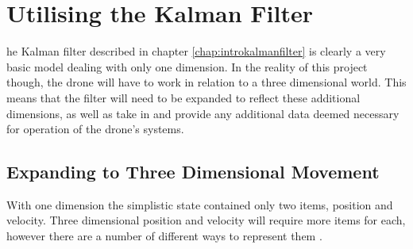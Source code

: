 \let\textcircled=\pgftextcircled
\chapter{Utilising the Kalman Filter}
\label{chap:utilisingkalman}

he Kalman filter described in chapter \ref{chap:introkalmanfilter} is clearly a very basic model dealing with only one dimension. In the reality of this project though, the drone will have to work in relation to a three dimensional world. This means that the filter will need to be expanded to reflect these additional dimensions, as well as take in and provide any additional data deemed necessary for operation of the drone's systems. \par

\section{Expanding to Three Dimensional Movement}
With one dimension the simplistic state contained only two items, position and velocity. Three dimensional position and velocity will require more items for each, however there are a number of different ways to represent them \cite{windall2008other}.

